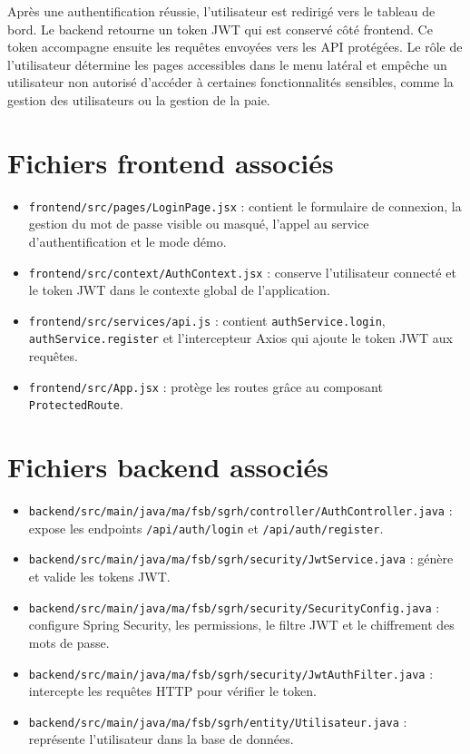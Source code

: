 \documentclass[12pt,a4paper]{report}
\begin{document}
Après une authentification réussie, l'utilisateur est redirigé vers le tableau de bord. Le backend retourne un token JWT qui est conservé côté frontend. Ce token accompagne ensuite les requêtes envoyées vers les API protégées. Le rôle de l'utilisateur détermine les pages accessibles dans le menu latéral et empêche un utilisateur non autorisé d'accéder à certaines fonctionnalités sensibles, comme la gestion des utilisateurs ou la gestion de la paie.

\section{Fichiers frontend associés}

\begin{itemize}
    \item \texttt{frontend/src/pages/LoginPage.jsx} : contient le formulaire de connexion, la gestion du mot de passe visible ou masqué, l'appel au service d'authentification et le mode démo.
    \item \texttt{frontend/src/context/AuthContext.jsx} : conserve l'utilisateur connecté et le token JWT dans le contexte global de l'application.
    \item \texttt{frontend/src/services/api.js} : contient \texttt{authService.login}, \texttt{authService.register} et l'intercepteur Axios qui ajoute le token JWT aux requêtes.
    \item \texttt{frontend/src/App.jsx} : protège les routes grâce au composant \texttt{ProtectedRoute}.
\end{itemize}

\section{Fichiers backend associés}

\begin{itemize}
    \item \texttt{backend/src/main/java/ma/fsb/sgrh/controller/AuthController.java} : expose les endpoints \texttt{/api/auth/login} et \texttt{/api/auth/register}.
    \item \texttt{backend/src/main/java/ma/fsb/sgrh/security/JwtService.java} : génère et valide les tokens JWT.
    \item \texttt{backend/src/main/java/ma/fsb/sgrh/security/SecurityConfig.java} : configure Spring Security, les permissions, le filtre JWT et le chiffrement des mots de passe.
    \item \texttt{backend/src/main/java/ma/fsb/sgrh/security/JwtAuthFilter.java} : intercepte les requêtes HTTP pour vérifier le token.
    \item \texttt{backend/src/main/java/ma/fsb/sgrh/entity/Utilisateur.java} : représente l'utilisateur dans la base de données.
\end{itemize}
\end{document}
